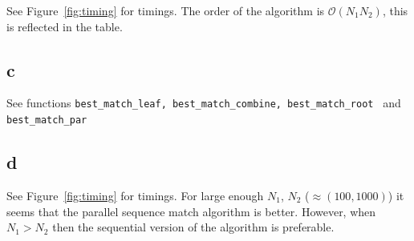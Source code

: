 \documentclass{article}
\begin{document}
See Figure~\ref{fig:timing} for timings. The order of the algorithm is $\mathcal{O}(N_1N_2)$, this is reflected in the table.



\subsection*{c}

See functions {\tt best\_match\_leaf, best\_match\_combine, best\_match\_root } and {\tt best\_match\_par}

\subsection*{d}
See Figure~\ref{fig:timing} for timings. For large enough $N_1$, $N_2$ ($\approx (100,1000)$) it seems that the parallel sequence match algorithm is better. However, when $N_1>N_2$ then the sequential version of the algorithm is preferable.
\end{document}
